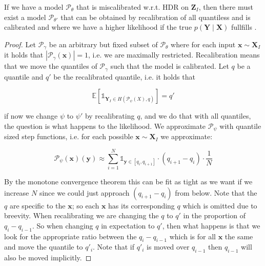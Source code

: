 \begin{lemma}\label{lem:likelihood_increase_calibration}
    If we have a model $\mathscr{P}_{\theta}$ that is miscalibrated w.r.t. HDR on $\mathbf{Z}_I$, then there must exist a model $\mathscr{P}_{\theta'}$ that can be obtained by recalibration of all quantiless and is calibrated and where we have a higher likelihood if the true $p(\mathbf{Y}\mid\mathbf{X})$ fullfills .
\end{lemma}

\begin{proof}
    Let $\mathscr{P}_\gamma$ be an arbitrary but fixed subset of $\mathscr{P}_\theta$ where for each input $\mathbf{x} \sim \mathbf{X}_I$ it holds that $|\mathscr{P}_\gamma(\mathbf{x})| = 1$, i.e. we are maximally restricted. Recalibration means that we move the quantiles of $\mathscr{P}_\gamma$ such that the model is calibrated. Let $q$ be a quantile and $q'$ be the recalibrated quantile, i.e. it holds that

    \begin{equation}
        \mathbb{E}\left[\mathds{1}_{\mathbf{Y}_I \in H(\mathscr{P}_\psi(X), q)}\right] = q'
    \end{equation}

    if now we change $\psi$ to $\psi'$ by recalibrating $q$, and we do that with all quantiles, the question is what happens to the likelihood. We approximate $\mathscr{P}_\psi$ with quantile sized step functions, i.e. for each possible $\mathbf{x} \sim \mathbf{X}_I$ we approximate:

    \begin{equation}
        \mathscr{P}_\psi(\mathbf{x})(\mathbf{y}) \approx \sum_{i=1}^N \mathds{1}_{\mathbf{y} \in [q_i, q_{i+1}]} \cdot (q_{i+1} - q_i) \cdot \frac{1}{N}
    \end{equation}

    By the monotone convergence theorem this can be fit as tight as we want if we increase $N$ since we could just approach $(q_{i+1} - q_i)$ from below. Note that the $q$ are specific to the $\mathbf{x}$; so each $\mathbf{x}$ has its corresponding $q$ which is omitted due to breevity. When recalibrating we are changing the $q$ to $q'$ in the proportion of $q_{i} - q_{i-1}$. So when changing $q$ in expectation to $q'$, then what happens is that we look for the appropriate ratio between the $q_{i} - q_{i-1}$ which is for all $\mathbf{x}$ the same and move the quantile to $q'_i$. Note that if $q'_i$ is moved over $q_{i-1}$ then $q_{i-1}$ will also be moved implicitly.


\end{proof}
